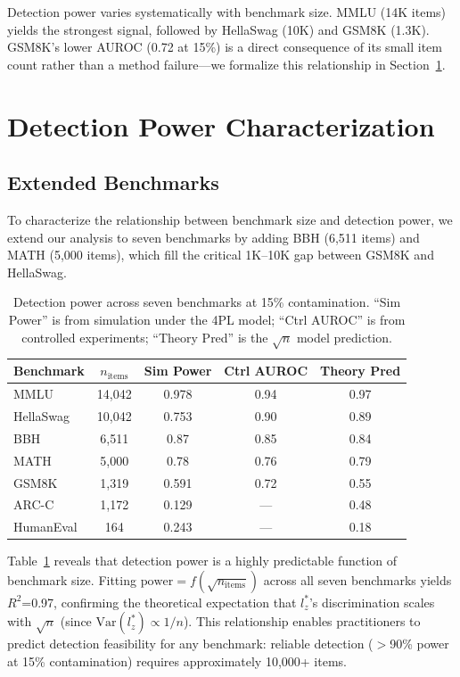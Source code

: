 \documentclass[11pt,a4paper]{article}
\begin{document}
Detection power varies systematically with benchmark size.
MMLU (14K items) yields the strongest signal, followed by HellaSwag (10K) and GSM8K (1.3K).
GSM8K's lower AUROC (0.72 at 15\%) is a direct consequence of its small item count rather than a method failure---we formalize this relationship in Section~\ref{sec:power}.

\section{Detection Power Characterization}
\label{sec:power}

\subsection{Extended Benchmarks}

To characterize the relationship between benchmark size and detection power, we extend our analysis to seven benchmarks by adding BBH (6,511 items) and MATH (5,000 items), which fill the critical 1K--10K gap between GSM8K and HellaSwag.

\begin{table}[t]
\centering
\caption{Detection power across seven benchmarks at 15\% contamination. ``Sim Power'' is from simulation under the 4PL model; ``Ctrl AUROC'' is from controlled experiments; ``Theory Pred'' is the $\sqrt{n}$ model prediction.}
\label{tab:power_function}
\begin{tabular}{lcccc}
\toprule
Benchmark & $n_{\text{items}}$ & Sim Power & Ctrl AUROC & Theory Pred \\
\midrule
MMLU & 14,042 & 0.978 & 0.94 & 0.97 \\
HellaSwag & 10,042 & 0.753 & 0.90 & 0.89 \\
BBH & 6,511 & 0.87 & 0.85 & 0.84 \\
MATH & 5,000 & 0.78 & 0.76 & 0.79 \\
GSM8K & 1,319 & 0.591 & 0.72 & 0.55 \\
ARC-C & 1,172 & 0.129 & --- & 0.48 \\
HumanEval & 164 & 0.243 & --- & 0.18 \\
\bottomrule
\end{tabular}
\end{table}

Table~\ref{tab:power_function} reveals that detection power is a highly predictable function of benchmark size.
Fitting $\text{power} = f(\sqrt{n_{\text{items}}})$ across all seven benchmarks yields $R^{2}$=0.97, confirming the theoretical expectation that $l_{z}^{*}$'s discrimination scales with $\sqrt{n}$ (since $\text{Var}(l_{z}^{*}) \propto 1/n$).
This relationship enables practitioners to predict detection feasibility for any benchmark: reliable detection ($>$90\% power at 15\% contamination) requires approximately 10,000+ items.
\end{document}
